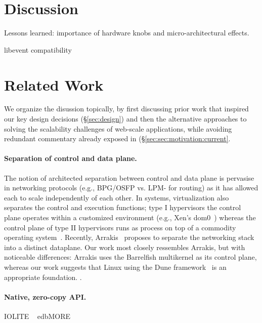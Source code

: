 

\section{Discussion}

\todo Lessons learned: importance of hardware knobs and micro-architectural effects.

\todo libevent compatibility


\section{Related Work}

We organize the disussion topically, by first discussing prior work
that inspired our key design decisions (\S\ref{sec:design}) and then
the alternative approaches to solving the scalability challenges of
web-scale applications, while avoiding redundant commentary already
exposed in (\S\ref{sec:sec:motivation:current}.


\paragraph{Separation of control and data plane.}

The notion of architected separation between control and data plane is
pervasise in networking protocols (e.g., BPG/OSFP vs. LPM- for
routing) as it has allowed each to scale independently of each other.
In systems, virtualization also separates the control and execution
functions; type I hypervisors the control plane operates within a
customized environment (e.g., Xen's
dom0~\cite{DBLP:conf/sosp/BarhamDFHHHN03}) whereas the control plane
of type II hypervisors runs as process on top of a commodity operating
system~\cite{DBLP:journals/tocs/BugnionDRSW12}.  Recently,
Arrakis~\cite{peter2013arrakis,arrakisTR13} proposes to separate the
networking stack into a distinct dataplane.  Our work most closely
ressembles Arrakis, but with noticeable differences: Arrakis uses the
Barrelfish multikernel as its control plane, whereas our work suggests
that Linux using the Dune framework~\cite{belay2012dune} is an
appropriate foundation.  .


\paragraph{Native, zero-copy API.}

\todo IOLITE ~\cite{DBLP:journals/tocs/PaiDZ00}
\todo edb{MORE}

